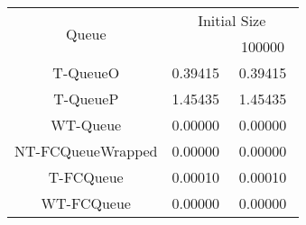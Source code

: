 \begin{tabular}{|c|c|c|}
\hline
\multirow{2}{*}{Queue} & \multicolumn{2}{c|}{Initial Size}\\\cline{2-3}& \quad 10000 \quad\quad & ~100000~\\
\hline
\hline
T-QueueO & 0.39415 & 0.39415\\
T-QueueP & 1.45435 & 1.45435\\
WT-Queue & 0.00000 & 0.00000\\
NT-FCQueueWrapped & 0.00000 & 0.00000\\
T-FCQueue & 0.00010 & 0.00010\\
WT-FCQueue & 0.00000 & 0.00000\\
\hline\end{tabular}
